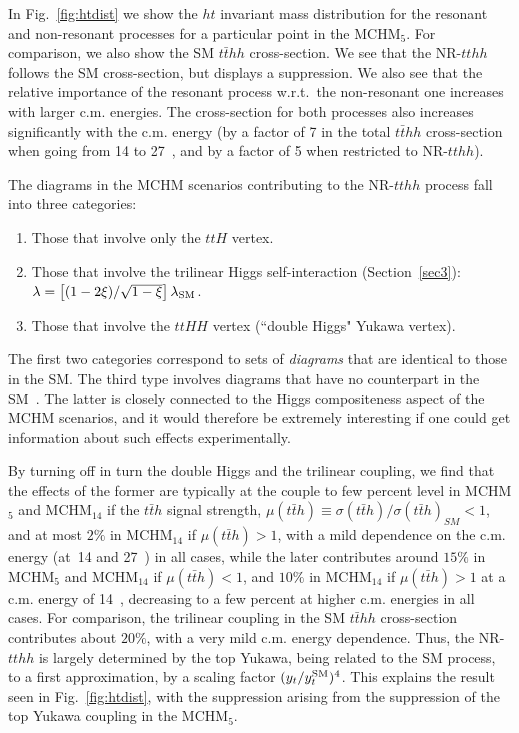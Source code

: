 In Fig.~\ref{fig:htdist} we show the $ht$ invariant mass distribution
for the resonant and non-resonant processes for a particular point in
the MCHM$_5$.  For comparison, we also show the SM $t\bar{t}hh$
cross-section.  We see that the NR-$tthh$ follows the SM cross-section,
but displays a suppression.  We also see that the relative importance
of the resonant process w.r.t.~the non-resonant one increases with
larger c.m. energies.  The cross-section for both processes also
increases significantly with the c.m. energy (by a factor of 7 in the
total $t\bar{t}hh$ cross-section when going from 14 to 27~\UTeV, and by
a factor of 5 when restricted to NR-$tthh$). 

\label{NRtth}
The diagrams in the MCHM scenarios contributing to the NR-$tthh$ process
fall into three categories:
%
\begin{enumerate}
\item Those that involve only the $ttH$ vertex.
\item Those that involve the trilinear Higgs self-interaction (Section~\ref{sec3}):
$\lambda = \left[ (1 - 2 \xi)/\sqrt{1 - \xi} \right] \lambda_{\rm
SM}$.
\item Those that involve the $ttHH$ vertex (``double Higgs" Yukawa vertex).
\end{enumerate}
%
The first two categories correspond to sets of \textit{diagrams} that
are identical to those in the SM. The third type involves diagrams
that have no counterpart in the SM~\cite{Contino:2012xk}.  The latter
is closely connected to the Higgs compositeness aspect of the MCHM
scenarios, and it would therefore be extremely interesting if one
could get information about such effects experimentally.

By turning off in turn the double Higgs and the trilinear coupling, we find that the effects of the former are
typically at the couple to few percent level in MCHM$_5$ and MCHM$_{14}$ if the $t\bar{t}h$ signal strength,
$\mu(t\bar{t}h) \equiv \sigma(t\bar{t}h)/{\sigma(t\bar{t}h)}_{SM} < 1$, 
and at most $2\%$ in MCHM$_{14}$ if $\mu(t\bar{t}h) > 1$, with a mild dependence
on the c.m. energy (at~14 and 27~\UTeV) in all cases, while the later contributes around $15\%$ in MCHM$_5$ and MCHM$_{14}$ if $\mu(t\bar{t}h) < 1$, and $10\%$ in MCHM$_{14}$ if $\mu(t\bar{t}h) > 1$ at a c.m. energy of 14~\UTeV, decreasing to a few
percent at higher c.m. energies in all cases.  For comparison, the trilinear coupling in the SM $t\bar{t}hh$ cross-section
contributes about $20\%$, with a very mild c.m. energy dependence.  Thus, the NR-$tthh$ is largely determined
by the top Yukawa, being related to the SM process, to a first approximation, by a scaling factor $(y_t / y_t^ {\rm SM})^4$.
This explains the result seen in Fig.~\ref{fig:htdist}, with the
suppression arising from the suppression of the top Yukawa coupling in
the MCHM$_5$.

